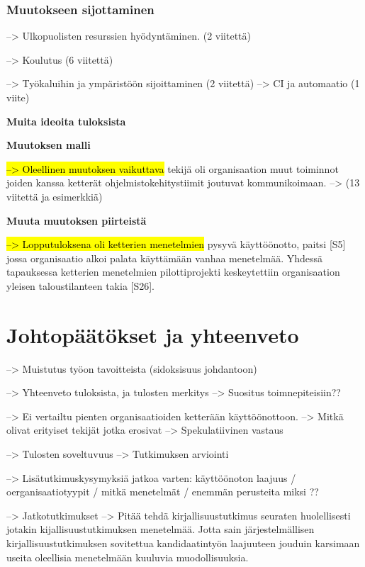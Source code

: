 \subsubsection{Muutokseen sijottaminen}

--> Ulkopuolisten resurssien hyödyntäminen. (2 viitettä)

--> Koulutus (6 viitettä)

--> Työkaluihin ja ympäristöön sijoittaminen (2 viitettä)
--> CI ja automaatio (1 viite)

\vspace{1cm}
\large
\textbf{Muita ideoita tuloksista}
\normalsize

\textbf{Muutoksen malli}

\hl{--> Oleellinen muutoksen vaikuttava} tekijä oli organisaation muut toiminnot
joiden kanssa ketterät ohjelmistokehitystiimit joutuvat kommunikoimaan.
--> (13 viitettä ja esimerkkiä)

\textbf{Muuta muutoksen piirteistä}

\hl{--> Lopputuloksena oli ketterien menetelmien} pysyvä käyttöönotto, paitsi [S5]
jossa organisaatio alkoi palata käyttämään vanhaa menetelmää. Yhdessä
tapauksessa ketterien menetelmien pilottiprojekti keskeytettiin
organisaation yleisen taloustilanteen takia [S26].

\clearpage
\section{Johtopäätökset ja yhteenveto}
\label{sec:johtopaatokset}

--> Muistutus työon tavoitteista (sidoksisuus johdantoon)

--> Yhteenveto tuloksista, ja tulosten merkitys
--> Suositus toimnepiteisiin??

--> Ei vertailtu pienten organisaatioiden ketterään käyttöönottoon.
--> Mitkä olivat erityiset tekijät jotka erosivat
--> Spekulatiivinen vastaus

--> Tulosten soveltuvuus
--> Tutkimuksen arviointi

--> Lisätutkimuskysymyksiä jatkoa varten: käyttöönoton laajuus /
oerganisaatiotyypit / mitkä menetelmät / enemmän perusteita miksi ?? 

--> Jatkotutkimukset
--> Pitää tehdä kirjallisuustutkimus seuraten huolellisesti jotakin
kijallisuustutkimuksen menetelmää. Jotta sain järjestelmällisen
kirjallisuustutkimuksen sovitettua kandidaatintyön laajuuteen jouduin
karsimaan useita oleellisia menetelmään kuuluvia muodollisuuksia.

